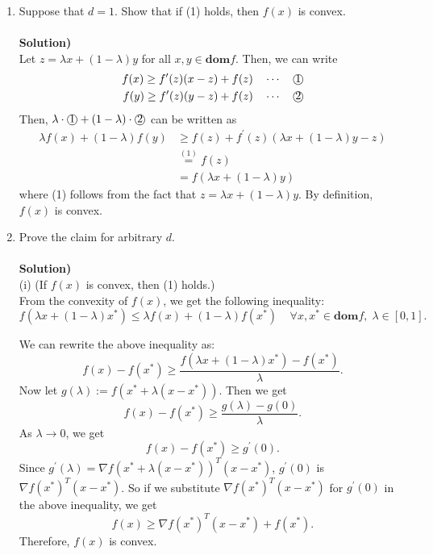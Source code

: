 \documentclass{article}
\begin{document}
\begin{enumerate}
\begin{enumerate}
\item Suppose that $d=1$. Show that if (1) holds, then $f(x)$ is convex.\\\\
\textbf{Solution)}\\
Let $z=\lambda x+(1-\lambda)y$ for all $x,y\in \textbf{dom}f$. Then, we can write
\begin{align*}
	f(x)\geq f^\prime (z)(x-z)+f(z)\quad\cdots\quad\text{\textcircled{1}}\\
	f(y)\geq f^\prime (z)(y-z)+f(z)\quad\cdots\quad\text{\textcircled{2}}
\end{align*}
Then, $\lambda \cdot \text{\textcircled{1}}+(1-\lambda)\cdot \text{\textcircled{2}}$ can be written as
\begin{align*}
	\lambda f(x)+(1-\lambda)f(y)&\geq f(z)+f^\prime (z)(\lambda x+(1-\lambda)y-z)\\
	&\stackrel{(1)}{=}f(z)\\
	&=f(\lambda x+(1-\lambda)y)
\end{align*}
where (1) follows from the fact that $z=\lambda x+(1-\lambda)y$. By definition, $f(x)$ is convex.

\item Prove the claim for arbitrary $d$.\\\\
\textbf{Solution)}\\
(i) (If $f(x)$ is convex, then (1) holds.)\\
From the convexity of $f(x)$, we get the following inequality:
\begin{equation*}
	f(\lambda x+(1-\lambda)x^*)\leq \lambda f(x)+(1-\lambda)f(x^*)\;\;\;\; \forall x,x^*\in \textbf{dom}f,\; \lambda \in [0,1].
\end{equation*}

We can rewrite the above inequality as:
\begin{equation*}
	f(x)-f(x^*)\geq \frac{f(\lambda x+(1-\lambda)x^*)-f(x^*)}{\lambda}.
\end{equation*}
Now let $g(\lambda):=f(x^*+\lambda(x-x^*))$. Then we get
\begin{equation*}
	f(x)-f(x^*)\geq \frac{g(\lambda)-g(0)}{\lambda}.
\end{equation*}
As $\lambda \rightarrow 0$, we get
\begin{equation*}
	f(x)-f(x^*)\geq g^\prime (0).
\end{equation*}
Since $g^\prime(\lambda)=\nabla f(x^*+\lambda (x-x^*))^T(x-x^*)$, $g^\prime(0)$ is $\nabla f(x^*)^T(x-x^*)$. So if we substitute $\nabla f(x^*)^T(x-x^*)$ for $g^\prime(0)$ in the above inequality, we get 
\begin{equation*}
	f(x)\geq \nabla f(x^*)^T(x-x^*)+f(x^*).
\end{equation*}
Therefore, $f(x)$ is convex.\\


\end{enumerate}
\end{enumerate}
\end{document}

